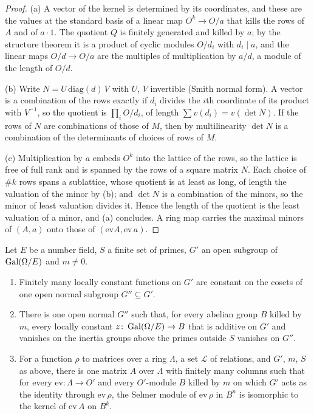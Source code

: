 \begin{proof}
(a) A vector of the kernel is determined by its coordinates, and these are the values at the standard basis of a linear map $O^k\to O/a$ that kills the rows of $A$ and of $a\cdot1$. The quotient $Q$ is finitely generated and killed by $a$; by the structure theorem it is a product of cyclic modules $O/d_i$ with $d_i\mid a$, and
the linear maps $O/d\to O/a$ are the multiples of multiplication by $a/d$, a module of the length of $O/d$.

(b) Write $N=U\,\mathrm{diag}(d)\,V$ with $U$, $V$ invertible (Smith normal form). A vector is a combination of the rows exactly if $d_i$ divides the $i$th coordinate of its product with $V^{-1}$, so the quotient is $\prod_iO/d_i$, of length $\sum v(d_i)=v(\det N)$. If the rows of $N$ are combinations of those of $M$, then by
multilinearity $\det N$ is a combination of the determinants of choices of rows of $M$.

(c) Multiplication by $a$ embeds $O^k$ into the lattice of the rows, so the lattice is free of full rank and is spanned by the rows of a square matrix $N$. Each choice of $\#k$ rows spans a sublattice, whose quotient is at least as long, of length the valuation of the minor by (b); and $\det N$ is a combination of the minors, so
the minor of least valuation divides it. Hence the length of the quotient is the least valuation of a minor, and (a) concludes. A ring map carries the maximal minors of $(A,a)$ onto those of $(\mathrm{ev}A,\mathrm{ev}\,a)$.
\end{proof}

\begin{lemma}\label{lem:one-quotient}
Let $E$ be a number field, $S$ a finite set of primes, $G'$ an open subgroup of $\operatorname{Gal}(\Omega/E)$ and $m\ne0$.
\begin{enumerate}[label=\textup{(\alph*)}]
\item Finitely many locally constant functions on $G'$ are constant on the cosets of one open normal subgroup $G''\subseteq G'$.
\item There is one open normal $G''$ such that, for every abelian group $B$ killed by $m$, every locally constant $z\colon\operatorname{Gal}(\Omega/E)\to B$ that is additive on $G'$ and vanishes on the inertia groups above the primes outside $S$ vanishes on $G''$.
\item For a function $\rho$ to matrices over a ring $\Lambda$, a set $\mathcal L$ of relations, and $G'$, $m$, $S$ as above, there is one matrix $A$ over $\Lambda$ with finitely many columns such that for every $\mathrm{ev}\colon\Lambda\to O'$ and every $O'$-module $B$ killed by $m$ on which $G'$ acts as the identity through
$\mathrm{ev}\,\rho$, the Selmer module of $\mathrm{ev}\,\rho$ in $B^n$ is isomorphic to the kernel of $\mathrm{ev}\,A$ on $B^k$.
\end{enumerate}
\end{lemma}

